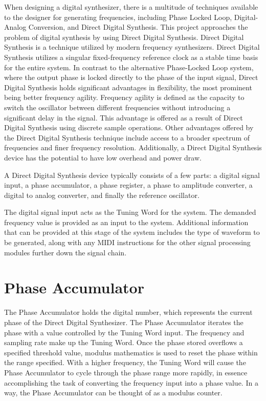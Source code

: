 \documentclass[a4paper,12pt]{report}
\begin{document}
When designing a digital synthesizer, there is a multitude of techniques available to the designer for generating frequencies, including Phase Locked Loop, Digital-Analog Conversion, and Direct Digital Synthesis. This project approaches the problem of digital synthesis by using Direct Digital Synthesis. Direct Digital Synthesis is a technique utilized by modern frequency synthesizers. Direct Digital Synthesis utilizes a singular fixed-frequency reference clock as a stable time basis for the entire system. In contrast to the alternative Phase-Locked Loop system, where the output phase is locked directly to the phase of the input signal, Direct Digital Synthesis holds significant advantages in flexibility, the most prominent being better frequency agility. Frequency agility is defined as the capacity to switch the oscillator between different frequencies without introducing a significant delay in the signal. This advantage is offered as a result of Direct Digital Synthesis using discrete sample operations. Other advantages offered by the Direct Digital Synthesis technique include access to a broader spectrum of frequencies and finer frequency resolution. Additionally, a Direct Digital Synthesis device has the potential to have low overhead and power draw.

A Direct Digital Synthesis device typically consists of a few parts: a digital signal input, a phase accumulator, a phase register, a phase to amplitude converter, a digital to analog converter, and finally the reference oscillator.

The digital signal input acts as the Tuning Word for the system. The demanded frequency value is provided as an input to the system. Additional information that can be provided at this stage of the system includes the type of waveform to be generated, along with any MIDI instructions for the other signal processing modules further down the signal chain.

\section{Phase Accumulator}
The Phase Accumulator holds the digital number, which represents the current phase of the Direct Digital Synthesizer. The Phase Accumulator iterates the phase with a value controlled by the Tuning Word input. The frequency and sampling rate make up the Tuning Word. Once the phase stored overflows a specified threshold value, modulus mathematics is used to reset the phase within the range specified. With a higher frequency, the Tuning Word will cause the Phase Accumulator to cycle through the phase range more rapidly, in essence accomplishing the task of converting the frequency input into a phase value. In a way, the Phase Accumulator can be thought of as a modulus counter.
\end{document}
